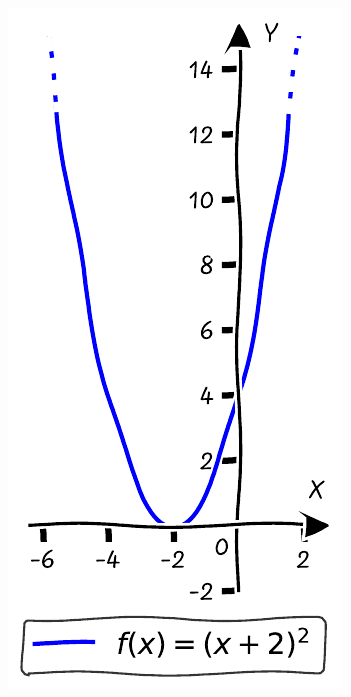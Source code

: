 \documentclass[nobib]{tufte-handout}
\begin{document}
\begin{figure}[h]
  \begin{minipage}{0.19\textwidth}
    \includegraphics[width=\linewidth]{./graphs/quadratic_func_lsh_2.pdf}
    \label{fig:first}

\end{minipage}
\end{figure}
\end{document}
